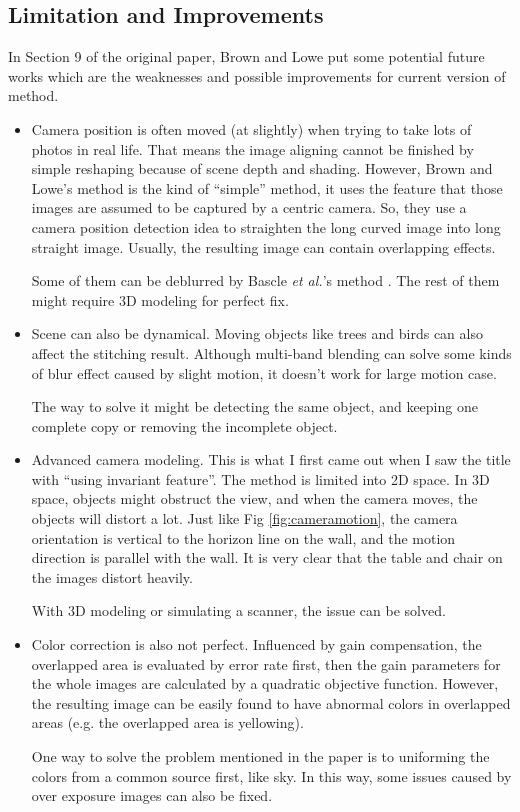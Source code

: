 \documentclass[10pt,twocolumn,letterpaper]{article}
\begin{document}
\subsection{Limitation and Improvements}
In Section 9 of the original paper, Brown and Lowe put some potential future works which are the weaknesses and possible improvements for current version of method.
\begin{itemize}
    \item
        Camera position is often moved (at slightly) when trying to take lots of photos in real life.
        That means the image aligning cannot be finished by simple reshaping because of scene depth and shading.
        However, Brown and Lowe's method is the kind of ``simple'' method, it uses the feature that those images are assumed to be captured by a centric camera.
        So, they use a camera position detection idea to straighten the long curved image into long straight image.
        Usually, the resulting image can contain overlapping effects.

        Some of them can be deblurred by Bascle \textit{et al.}'s method \cite{bascle}.
        The rest of them might require 3D modeling for perfect fix.
    \item
        Scene can also be dynamical. Moving objects like trees and birds can also affect the stitching result.
        Although multi-band blending can solve some kinds of blur effect caused by slight motion,
        it doesn't work for large motion case.

        The way to solve it might be detecting the same object, and keeping one complete copy or removing the incomplete object.
    \item
        Advanced camera modeling. This is what I first came out when I saw the title with ``using invariant feature''.
        The method is limited into 2D space. In 3D space, objects might obstruct the view, and when the camera moves, the objects will distort a lot.
        Just like Fig \ref{fig:cameramotion}, the camera orientation is vertical to the horizon line on the wall, and the motion direction is parallel with the wall.
        It is very clear that the table and chair on the images distort heavily.
        
        With 3D modeling or simulating a scanner, the issue can be solved.
    \item
        Color correction is also not perfect.
        Influenced by gain compensation, the overlapped area is evaluated by error rate first,
        then the gain parameters for the whole images are calculated by a quadratic objective function.
        However, the resulting image can be easily found to have abnormal colors in overlapped areas (e.g. the overlapped area is yellowing).

        One way to solve the problem mentioned in the paper is to uniforming the colors from a common source first, like sky.
        In this way, some issues caused by over exposure images can also be fixed.
\end{itemize}
\end{document}
